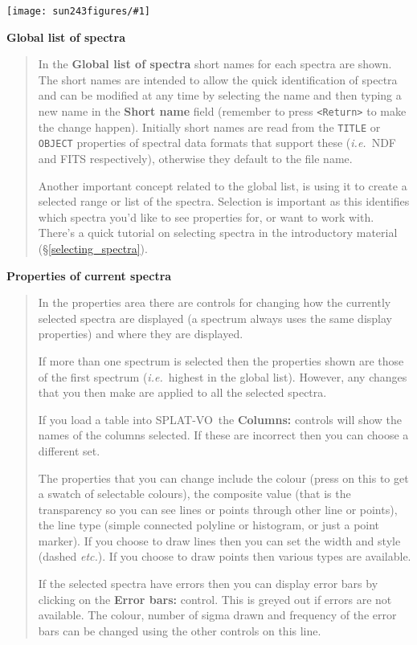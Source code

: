 \documentclass[twoside,11pt]{article}
\newcommand{\htmladdimg}[1]{}
\newcommand{\htmlref}[2]{#1}
\newcommand{\latex}[1]{#1}
\newcommand{\latexhtml}[2]{#1}
\renewcommand{\_}{\texttt{\symbol{95}}}
\newcommand{\SPLAT}{\textsf{SPLAT-VO}}
\newcommand{\mainfigure}[1]
{\begin{center}
 \latexhtml{\texttt{[image: sun243\_figures/\#1]}}{\htmladdimg{#1.gif}}
 \end{center}
}
\newcommand{\labelitem}[1]{\textbf{#1}}
\newcommand{\hitext}[1]{\texttt{#1}}
\newcommand{\ie}{\textit{i.e.}}
\newcommand{\etc}{\textit{etc.}}
\newcommand{\subheading}[1]{\textbf{\large{#1}}}
\begin{document}
\mainfigure{browser5}

\subheading{Global list of spectra}
\begin{quote}
 In the \labelitem{Global list of spectra} short names for each
 spectra are shown. The short names are intended to allow the quick
 identification of spectra and can be modified at any time by
 selecting the name and then typing a new name in the
 \labelitem{Short name} field (remember to press \hitext{<Return>} to
 make the change happen). Initially short names are read from the
 \hitext{TITLE} or \hitext{OBJECT} properties of spectral data formats
 that support these (\ie\ NDF and FITS respectively), otherwise they
 default to the file name.

 Another important concept related to the global list, is using it to
 create a selected range or list of the spectra. Selection is
 important as this identifies which spectra you'd like to see
 properties for, or want to work with. There's a quick tutorial on
 \htmlref{selecting spectra}{selecting_spectra} in the introductory material
 \latex{(\S\ref{selecting_spectra})}.
\end{quote}

\subheading{Properties of current spectra}
\begin{quote}
 In the properties area there are controls for changing how the currently
 selected spectra are displayed (a spectrum always uses the same display
 properties) and where they are displayed.

 If more than one spectrum is selected then the properties shown are those of
 the first spectrum (\ie\ highest in the global list). However, any changes
 that you then make are applied to all the selected spectra.

 If you load a table into \SPLAT\ the \labelitem{Columns:} controls will show
 the names of the columns selected. If these are incorrect then you can choose
 a different set.

 The properties that you can change include the colour (press on this to get a
 swatch of selectable colours), the composite value (that is the transparency
 so you can see lines or points through other line or points), the line type
 (simple connected polyline or histogram, or just a point marker). If you
 choose to draw lines then you can set the width and style (dashed \etc). If
 you choose to draw points then various types are available.

 If the selected spectra have errors then you can display error bars by
 clicking on the \labelitem{Error bars:} control. This is greyed out if errors
 are not available. The colour, number of sigma drawn and frequency of the
 error bars can be changed using the other controls on this line.

\end{quote}
\end{document}
